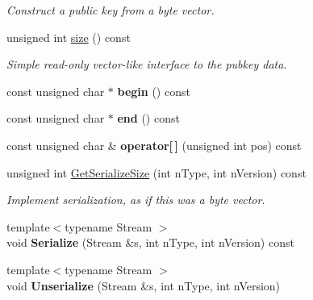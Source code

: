 \begin{DoxyCompactItemize}
\begin{DoxyCompactList}\small\item\em Construct a public key from a byte vector. \end{DoxyCompactList}\item 
\mbox{\label{class_c_pub_key_a6bb28fcf0a5f799c69f5b7269363b309}} 
unsigned int \mbox{\hyperlink{class_c_pub_key_a6bb28fcf0a5f799c69f5b7269363b309}{size}} () const
\begin{DoxyCompactList}\small\item\em Simple read-\/only vector-\/like interface to the pubkey data. \end{DoxyCompactList}\item 
\mbox{\label{class_c_pub_key_a859ab9909d68092d6d4fc739237ab358}} 
const unsigned char $\ast$ {\bfseries begin} () const
\item 
\mbox{\label{class_c_pub_key_a1d6fb1ec2b45fb229f549215d6a23dbc}} 
const unsigned char $\ast$ {\bfseries end} () const
\item 
\mbox{\label{class_c_pub_key_ab94321a511874f4a3cdf21f889d30144}} 
const unsigned char \& {\bfseries operator\mbox{[}$\,$\mbox{]}} (unsigned int pos) const
\item 
\mbox{\label{class_c_pub_key_aeb5fed8b8e3dea754e485147c1a1a8ed}} 
unsigned int \mbox{\hyperlink{class_c_pub_key_aeb5fed8b8e3dea754e485147c1a1a8ed}{Get\+Serialize\+Size}} (int n\+Type, int n\+Version) const
\begin{DoxyCompactList}\small\item\em Implement serialization, as if this was a byte vector. \end{DoxyCompactList}\item 
\mbox{\label{class_c_pub_key_a6003c13fc0a48bae69c2a7ddb1fecc21}} 
{\footnotesize template$<$typename Stream $>$ }\\void {\bfseries Serialize} (Stream \&s, int n\+Type, int n\+Version) const
\item 
\mbox{\label{class_c_pub_key_a1cfd8e3c711f5298eecdacd5979f6e6c}} 
{\footnotesize template$<$typename Stream $>$ }\\void {\bfseries Unserialize} (Stream \&s, int n\+Type, int n\+Version)

\end{DoxyCompactItemize}
